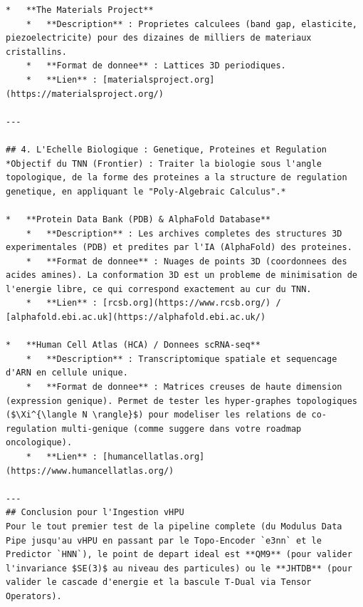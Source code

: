 \documentclass[11pt,a4paper]{article}
\begin{document}
\begin{lstlisting}[language={}, caption={}, basicstyle=\ttfamily\footnotesize, breaklines=true]
*   **The Materials Project**
    *   **Description** : Proprietes calculees (band gap, elasticite, piezoelectricite) pour des dizaines de milliers de materiaux cristallins.
    *   **Format de donnee** : Lattices 3D periodiques.
    *   **Lien** : [materialsproject.org](https://materialsproject.org/)

---

## 4. L'Echelle Biologique : Genetique, Proteines et Regulation
*Objectif du TNN (Frontier) : Traiter la biologie sous l'angle topologique, de la forme des proteines a la structure de regulation genetique, en appliquant le "Poly-Algebraic Calculus".*

*   **Protein Data Bank (PDB) & AlphaFold Database**
    *   **Description** : Les archives completes des structures 3D experimentales (PDB) et predites par l'IA (AlphaFold) des proteines.
    *   **Format de donnee** : Nuages de points 3D (coordonnees des acides amines). La conformation 3D est un probleme de minimisation de l'energie libre, ce qui correspond exactement au cur du TNN.
    *   **Lien** : [rcsb.org](https://www.rcsb.org/) / [alphafold.ebi.ac.uk](https://alphafold.ebi.ac.uk/)

*   **Human Cell Atlas (HCA) / Donnees scRNA-seq**
    *   **Description** : Transcriptomique spatiale et sequencage d'ARN en cellule unique.
    *   **Format de donnee** : Matrices creuses de haute dimension (expression genique). Permet de tester les hyper-graphes topologiques ($\Xi^{\langle N \rangle}$) pour modeliser les relations de co-regulation multi-genique (comme suggere dans votre roadmap oncologique).
    *   **Lien** : [humancellatlas.org](https://www.humancellatlas.org/)

---
## Conclusion pour l'Ingestion vHPU
Pour le tout premier test de la pipeline complete (du Modulus Data Pipe jusqu'au vHPU en passant par le Topo-Encoder `e3nn` et le Predictor `HNN`), le point de depart ideal est **QM9** (pour valider l'invariance $SE(3)$ au niveau des particules) ou le **JHTDB** (pour valider le cascade d'energie et la bascule T-Dual via Tensor Operators).

\end{lstlisting}
\end{document}
